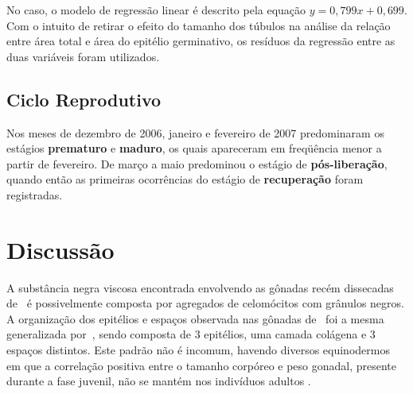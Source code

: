 No caso, o modelo de regressão linear é descrito pela equação $y=0,799x+0,699$.
Com o intuito de retirar o efeito do tamanho dos túbulos na análise da relação entre área total e área do epitélio germinativo, os resíduos da regressão entre as duas variáveis foram utilizados.

\subsection{Ciclo Reprodutivo}\label{cap3:res:ciclo}

Nos meses de dezembro de 2006, janeiro e fevereiro de 2007 predominaram os estágios \textbf{prematuro} e \textbf{maduro}, os quais apareceram em freqüência menor a partir de fevereiro.
De março a maio predominou o estágio de \textbf{pós-liberação}, quando então as primeiras ocorrências do estágio de \textbf{recuperação} foram registradas.

\section{Discussão}\label{cap3:disc}

A substância negra viscosa encontrada envolvendo as gônadas recém dissecadas de \subde\ é possivelmente composta por agregados de celomócitos com grânulos negros.
A organização dos epitélios e espaços observada nas gônadas de \subdeshort\ foi a mesma generalizada por~\citet[pg.~529]{Pearse1991}, sendo composta de 3 epitélios, uma camada colágena e 3 espaços distintos.
Este padrão não é incomum, havendo diversos equinodermos em que a correlação positiva entre o tamanho corpóreo e peso gonadal, presente durante a fase juvenil, não se mantém nos indivíduos adultos \citep[e.g.,][]{Lane1979,Pearse1991,Tavares2006}.

